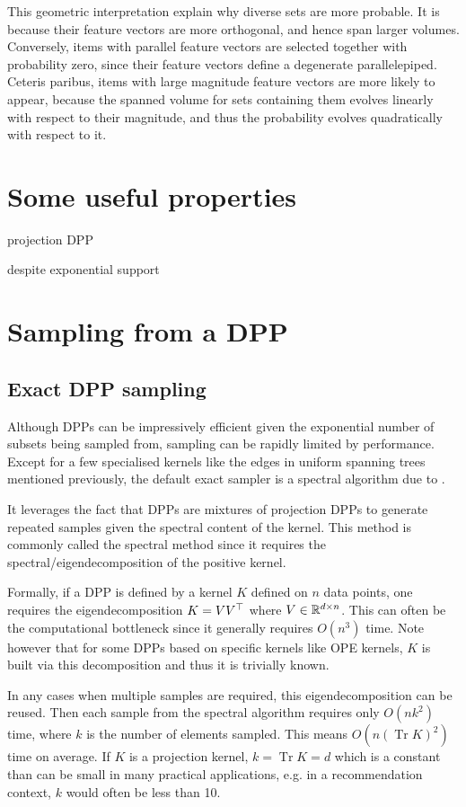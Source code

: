 This geometric interpretation explain why diverse sets are more probable. It is because their feature vectors are more orthogonal, and hence span larger volumes. Conversely, items with parallel feature vectors are selected together with probability zero, since their feature vectors define a degenerate parallelepiped. Ceteris paribus, items with large magnitude feature vectors are more likely to appear, because the spanned volume for sets containing them evolves linearly with respect to their magnitude, and thus the probability evolves quadratically with respect to it.


\section{Some useful properties}
projection DPP

despite exponential support




\section{Sampling from a DPP}
\subsection{Exact DPP sampling}


Although DPPs can be impressively efficient given the exponential number of subsets being sampled from, sampling can be rapidly limited by performance. 
Except for a few specialised kernels like the edges in uniform spanning trees mentioned previously, the default exact sampler is a spectral algorithm due to \cite{hough2006_hkpv}.

It leverages the fact that DPPs are mixtures of projection DPPs to generate repeated samples given the spectral content of the kernel. This method is commonly called the spectral method since it requires the spectral/eigendecomposition of the positive kernel. 

Formally, if a DPP is defined by a kernel $K$ defined on $n$ data points, one requires the eigendecomposition $K= V V^\top$  where $V \in \mathbb{R}^{d \times n}$. 
This can often be the computational bottleneck since it generally requires $O(n^3)$ time. Note however that for some DPPs based on specific kernels like OPE kernels, $K$ is built via this decomposition and thus it is trivially known.

In any cases when multiple samples are required, this eigendecomposition can be reused. Then each sample from the spectral algorithm requires only $O(n k^2)$ time, where $k$ is the number of elements sampled. This means $O(n (\operatorname{Tr} K)^2)$ time on average. If $K$ is a projection kernel, $k = \operatorname{Tr} K = d$ which is a constant than can be small in many practical applications, e.g. in a recommendation context, $k$ would often be less than 10.

